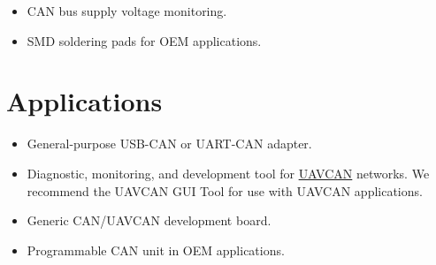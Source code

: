 \documentclass{zubaxdoc}
\begin{document}
\begin{titlepage}
\begin{itemize}
    \item CAN bus supply voltage monitoring.

    \item SMD soldering pads for OEM applications.
\end{itemize}

\BeginRightColumn

\section*{Applications}

\begin{itemize}
    \item General-purpose USB-CAN or UART-CAN adapter.
    \item Diagnostic, monitoring, and development tool for \href{http://uavcan.org}{UAVCAN} networks.
          We recommend the UAVCAN GUI Tool for use with UAVCAN applications.
    \item Generic CAN/UAVCAN development board.
    \item Programmable CAN unit in OEM applications.
\end{itemize}


\end{titlepage}

\tableofcontents
\BeginRightColumn
\listoffigures
\BeginRightColumn
\listoftables

\mainmatter
\end{document}
